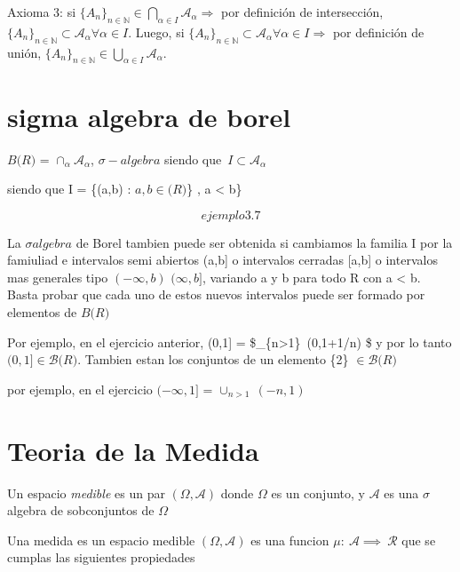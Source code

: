 \documentclass[
]{article}
\begin{document}
Axioma 3: si
\(\{A_n\}_{n \in \mathbb{N}} \in \bigcap\limits_{\alpha \in I} \mathcal{A}_{\alpha} \Rightarrow\)
por definición de intersección,
\(\{A_n\}_{n \in \mathbb{N}} \subset \mathcal{A}_{\alpha} \forall \alpha \in I\).
Luego, si
\(\{A_n\}_{n \in \mathbb{N}} \subset \mathcal{A}_{\alpha} \forall \alpha \in I \Rightarrow\)
por definición de unión,
\(\{A_n\}_{n \in \mathbb{N}} \in \bigcup\limits_{\alpha \in I} \mathcal{A}_{\alpha}\).

\hypertarget{sigma-algebra-de-borel}{%
\section{sigma algebra de borel}\label{sigma-algebra-de-borel}}

\(B\mathcal(R)\) = \(\cap_{\alpha}\mathcal{A_{\alpha}}\),
\(\sigma - algebra\) siendo que~\(I\subset\mathcal{A_{\alpha}}\)

siendo que I = \{(a,b) : \(a,b \in \mathcal(R)\)\} , a \textless{} b\}

\[ ejemplo 3.7\]

La \(\sigma algebra\) de Borel tambien puede ser obtenida si cambiamos
la familia I por la famiuliad e intervalos semi abiertos (a,b{]} o
intervalos cerradas {[}a,b{]} o intervalos mas generales tipo
\((-\infty,b)\) \((\infty,b]\), variando a y b para todo R con a
\textless{} b. Basta probar que cada uno de estos nuevos intervalos
puede ser formado por elementos de \(B\mathcal(R)\)

Por ejemplo, en el ejercicio anterior, (0,1{]} =
\$\cup\_\{n\textgreater1\}~(0,1+1/n) \$ y por lo tanto
\((0,1] \in \mathcal{B}{\mathcal(R)}\). Tambien estan los conjuntos de
un elemento \{2\} \(\in \mathcal{B}{\mathcal(R)}\)

por ejemplo, en el ejercicio \((-\infty,1]\) = \(\cup_{n>1}\ (-n,1)\)

\hypertarget{teoria-de-la-medida}{%
\section{Teoria de la Medida}\label{teoria-de-la-medida}}

Un espacio \emph{medible} es un par \((\Omega,\mathcal{A})\) donde
\(\Omega\) es un conjunto, y \(\mathcal{A}\) es una \(\sigma\) algebra
de sobconjuntos de \(\Omega\)

Una medida es un espacio medible \((\Omega,\mathcal{A})\) es una funcion
\(\mu:\ \mathcal{A} \implies\ \mathcal{R}\) que se cumplas las
siguientes propiedades
\end{document}
